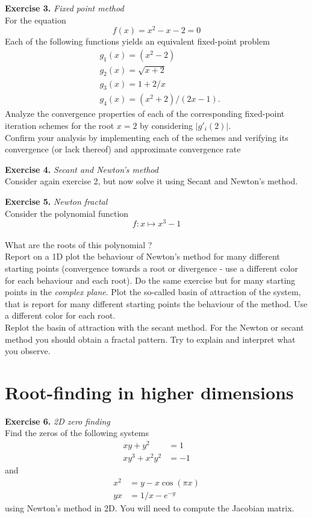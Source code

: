 \documentclass{article}
\begin{document}
\vspace{0.5cm}
\noindent \textbf{Exercise 3.} \textit{Fixed point method} \\
For the equation 
$$ f(x) = x^2 -x - 2 =0 $$
Each of the following functions yields an equivalent fixed-point problem
\begin{align}
&g_1(x)=\left(x^2-2\right) \\
&g_2(x)=\sqrt{x + 2} \\
&g_3(x)= 1 + 2 / x \\
&g_4(x)=\left(x^2+2\right) /(2x-1) .
\end{align}
Analyze the convergence properties of each
of the corresponding fixed-point iteration schemes
for the root $x = 2$ by considering $|g'_i(2)|$. \\
Confirm your analysis by implementing each
of the schemes and verifying its convergence (or
lack thereof) and approximate convergence rate

\vspace{0.5cm}
\noindent \textbf{Exercise 4.} \textit{Secant and Newton's method} \\
Consider again exercise 2, but now solve it using Secant and Newton's method. 


\vspace{0.5cm}
\noindent \textbf{Exercise 5.} \textit{Newton fractal} \\
Consider the polynomial function $$ f: x \mapsto x^3 - 1 $$ \\ What are the roots of this polynomial ? \\ Report on a 1D plot the behaviour of Newton's method for many different starting points (convergence towards a root or divergence - use a different color for each behaviour and each root). Do the same exercise but for many starting points in the \textit{complex plane}. Plot the so-called basin of attraction of the system, that is report for many different starting points the behaviour of the method. Use a different color for each root.
\vspace{0.2cm} \\
Replot the basin of attraction with the secant method. For the Newton or secant method you should obtain a fractal pattern. Try to explain and interpret what you observe.

\section*{Root-finding in higher dimensions}
\noindent \textbf{Exercise 6.} \textit{2D zero finding} \\
Find the zeros of the following systems
\begin{align*}
    xy + y^2 &= 1 \\
    xy^3 + x^2y^2 &= -1
\end{align*}
and 
\begin{align*}
    x^2 &= y - x \cos(\pi x) \\
    yx &= 1/x -  e^{-y}
\end{align*}
using Newton's method in 2D. You will need to compute the Jacobian matrix.
\end{document}

